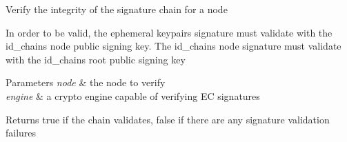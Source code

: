 Verify the integrity of the signature chain for a node

In order to be valid, the ephemeral keypair\textquotesingle{}s signature must validate with the id\+\_\+chain\textquotesingle{}s \textquotesingle{}node\textquotesingle{} public signing key. The id\+\_\+chain\textquotesingle{}s \textquotesingle{}node\textquotesingle{} signature must validate with the id\+\_\+chain\textquotesingle{}s \textquotesingle{}root\textquotesingle{} public signing key


\begin{DoxyParams}{Parameters}
{\em node} & the node to verify \\
\hline
{\em engine} & a crypto engine capable of verifying EC signatures \\
\hline
\end{DoxyParams}
\begin{DoxyReturn}{Returns}
true if the chain validates, false if there are any signature validation failures 
\end{DoxyReturn}
